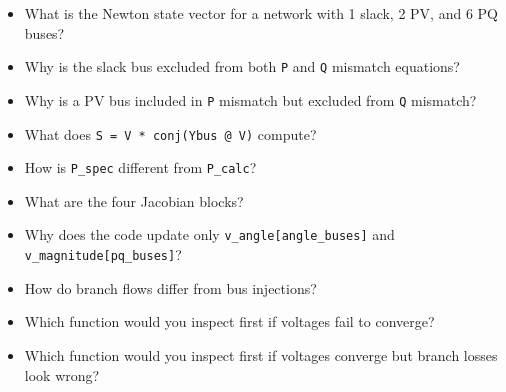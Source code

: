 \documentclass[11pt]{article}
\newcommand{\code}[1]{\texttt{#1}}
\begin{document}
\begin{itemize}
  \item What is the Newton state vector for a network with 1 slack, 2 PV, and 6
  PQ buses?
  \item Why is the slack bus excluded from both \code{P} and \code{Q} mismatch
  equations?
  \item Why is a PV bus included in \code{P} mismatch but excluded from
  \code{Q} mismatch?
  \item What does \code{S = V * conj(Ybus @ V)} compute?
  \item How is \code{P\_spec} different from \code{P\_calc}?
  \item What are the four Jacobian blocks?
  \item Why does the code update only \code{v\_angle[angle\_buses]} and
  \code{v\_magnitude[pq\_buses]}?
  \item How do branch flows differ from bus injections?
  \item Which function would you inspect first if voltages fail to converge?
  \item Which function would you inspect first if voltages converge but branch
  losses look wrong?
\end{itemize}
\end{document}
